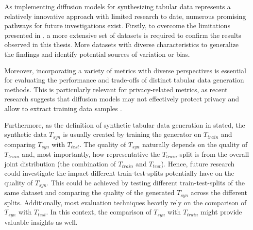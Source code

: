 As implementing diffusion models for synthesizing tabular data represents a relatively innovative approach with limited research to date, numerous promising pathways for future investigations exist.
Firstly, to overcome the limitations presented in , a more extensive set of datasets is required to confirm the results observed in this thesis.
More datasets with diverse characteristics to generalize the findings and identify potential sources of variation or bias.

Moreover, incorporating a variety of metrics with diverse perspectives is essential for evaluating the performance and trade-offs of distinct tabular data generation methods.
This is particularly relevant for privacy-related metrics, as recent research suggests that diffusion models may not effectively protect privacy and allow to extract training data samples \cite{carlini2023ExtractingTrainingData}.

Furthermore, as the definition of synthetic tabular data generation in  stated, the synthetic data $T_{syn}$ is usually created by training the generator on $T_{train}$ and comparing $T_{syn}$ with $T_{test}$.
The quality of $T_{syn}$ naturally depends on the quality of $T_{train}$ and, most importantly, how representative the $T_{train}$-split is from the overall joint distribution (the combination of $T_{train}$ and $T_{test}$).
Hence, future research could investigate the impact different train-test-splits potentially have on the quality of $T_{syn}$.
This could be achieved by testing different train-test-splits of the same dataset and comparing the quality of the generated $T_{syn}$ across the different splits.
Additionally, most evaluation techniques heavily rely on the comparison of $T_{syn}$ with $T_{test}$.
In this context, the comparison of $T_{syn}$ with $T_{train}$ might provide valuable insights as well.

